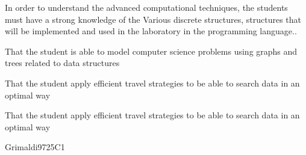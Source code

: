 \begin{syllabus}


\begin{justification}
In order to understand the advanced computational techniques, the students must have a strong knowledge of the
Various discrete structures, structures that will be implemented and used in the laboratory in the programming language..
\end{justification}

\begin{goals}
\item That the student is able to model computer science problems using graphs and trees related to data structures
\item That the student apply efficient travel strategies to be able to search data in an optimal way
\item That the student apply efficient travel strategies to be able to search data in an optimal way
\end{goals}

\begin{outcomes}
    \item {}
    \item {}	
    \item {}
\end{outcomes}

\begin{competences}
    \item {}
    \item {}
\end{competences}

\begin{unit}{\DSBasicsofCounting}{}{Grimaldi97}{25}{C1} 
    \begin{topics}
        \item \DSBasicsofCountingTopicCounting
	\item \DSBasicsofCountingTopicThePigeonhole
	\item \DSBasicsofCountingTopicPermutations
	\item \DSBasicsofCountingTopicSolving
	\item \DSBasicsofCountingTopicBasic
   \end{topics}
   \begin{learningoutcomes}
	\item \DSBasicsofCountingLOApplyCounting [\Familiarity]
	\item \DSBasicsofCountingLOApplyThe[\Familiarity]
	\item \DSBasicsofCountingLOComputePermutations[\Familiarity]
	\item \DSBasicsofCountingLOMap[\Familiarity]
	\item \DSBasicsofCountingLOSolveA[\Familiarity]
	\item \DSBasicsofCountingLOAnalyzeA[\Familiarity]
	\item \DSBasicsofCountingLOPerformComputations[\Familiarity]
   \end{learningoutcomes}
\end{unit}


\end{syllabus}
